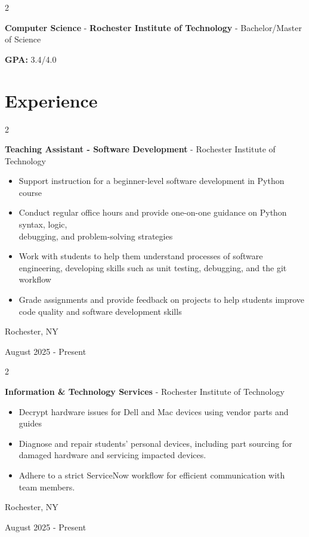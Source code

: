\documentclass[10pt, letterpaper]{article}
\newenvironment{highlights}{
    \begin{itemize}[
        topsep=0.10 cm,
        parsep=0.10 cm,
        partopsep=0pt,
        itemsep=0pt,
        leftmargin=0.4 cm + 10pt
    ]
}{
    \end{itemize}
} %
\newenvironment{twocolentry}[2][]{
    \onecolentry
    \def\secondColumn{#2}
    \setcolumnwidth{\fill, 4.5 cm}
    \begin{paracol}{2}
}{
    \switchcolumn \raggedleft \secondColumn
    \end{paracol}
    \endonecolentry
} %
\begin{document}
        
        \begin{twocolentry}
        {\textbf{GPA:} 3.4/4.0}
        {\textbf{Computer Science}
        \hspace{.15 cm} - \hspace{.15 cm}
        \textbf{Rochester Institute of Technology}
        \hspace{.15 cm} - \hspace{.15 cm}
        Bachelor/Master of Science}
        \end{twocolentry}

    
    \section{Experience}


        \begin{twocolentry}{
            Rochester, NY
            
            August 2025 - Present
        }
            \textbf{Teaching Assistant - Software Development} - Rochester Institute of Technology
            \begin{highlights}
            \item Support instruction for a beginner-level software development in Python course
            \item Conduct regular office hours and provide one-on-one guidance on Python syntax, logic,\\ debugging, and problem-solving strategies
            \item Work with students to help them understand processes of software engineering, developing skills such as unit testing, debugging, and the git workflow
            \item Grade assignments and provide feedback on projects to help students improve code quality and software development skills
            \end{highlights}
        \end{twocolentry}

        \vspace{0.05 cm}
        
       \begin{twocolentry}{
            Rochester, NY

        August 2025 - Present
        }
            \textbf{Information \& Technology Services} - Rochester Institute of Technology
            \begin{highlights}
                
                \item Decrypt hardware issues for Dell and Mac devices using vendor parts and guides
                \item Diagnose and repair students' personal devices, including part sourcing for damaged hardware and servicing impacted devices.
                \item Adhere to a strict ServiceNow workflow for efficient communication with team members.
    
            \end{highlights}
        \end{twocolentry}
\end{document}
